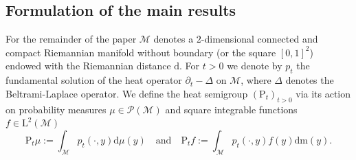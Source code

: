 \documentclass[11pt,a4paper,oneside]{amsart}
\numberwithin{equation}{section}
\newcommand{\dd}{\mathrm{d}}
\newcommand{\LL}{\mathrm{L}}
\newcommand{\m}{\mathrm{m}}
\begin{document}
%

%
\medskip
\subsection{Formulation of the main results}
%
For the remainder of the paper $\mathcal{M}$ denotes a $2$-dimensional connected and compact Riemannian manifold without boundary (or the square $[0,1]^2$) endowed with the Riemannian distance $\dd$. For $t>0$ we denote by $p_t$ the fundamental solution of the heat operator $\partial_t-\Delta$ on $\mathcal{M}$, where $\Delta$ denotes the Beltrami-Laplace operator. We define the heat semigroup $(\text{P}_t)_{t>0}$ via its action on probability measures $\mu \in \mathcal{P}(\mathcal{M})$ and square integrable functions $f\in\LL^2(\mathcal{M})$
\[
\text{P}_t \mu := \int_\mathcal{M} p_t(\cdot,y)\dd \mu(y) \quad\text{and}\quad \text{P}_t f:= \int_{\mathcal{M}} p_t(\cdot,y) f(y)\dd \m(y).
\]
%
\end{document}
